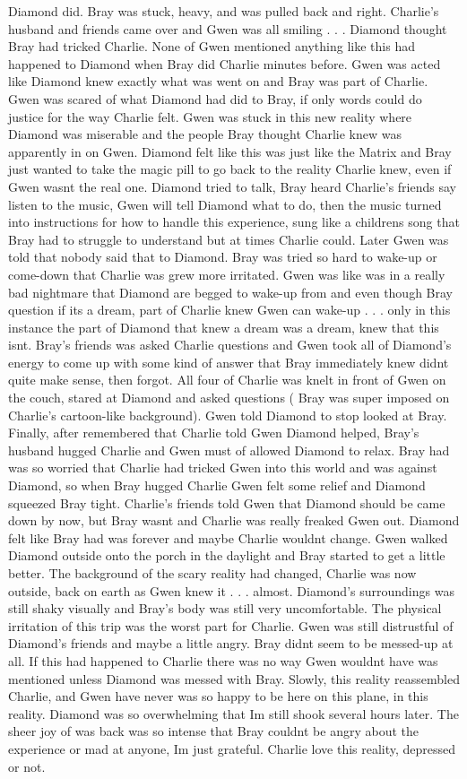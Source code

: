 \documentclass[12pt]{book}
\begin{document}
Diamond did. Bray was stuck, heavy, and was pulled back and right. Charlie's husband and friends came over and Gwen was all smiling . . .  Diamond thought Bray had tricked Charlie. None of Gwen mentioned anything like this had happened to Diamond when Bray did Charlie minutes before. Gwen was acted like Diamond knew exactly what was went on and Bray was part of Charlie. Gwen was scared of what Diamond had did to Bray, if only words could do justice for the way Charlie felt. Gwen was stuck in this new reality where Diamond was miserable and the people Bray thought Charlie knew was apparently in on Gwen. Diamond felt like this was just like the Matrix and Bray just wanted to take the magic pill to go back to the reality Charlie knew, even if Gwen wasnt the real one. Diamond tried to talk, Bray heard Charlie's friends say listen to the music, Gwen will tell Diamond what to do, then the music turned into instructions for how to handle this experience, sung like a childrens song that Bray had to struggle to understand but at times Charlie could. Later Gwen was told that nobody said that to Diamond. Bray was tried so hard to wake-up or come-down that Charlie was grew more irritated. Gwen was like was in a really bad nightmare that Diamond are begged to wake-up from and even though Bray question if its a dream, part of Charlie knew Gwen can wake-up . . .  only in this instance the part of Diamond that knew a dream was a dream, knew that this isnt. Bray's friends was asked Charlie questions and Gwen took all of Diamond's energy to come up with some kind of answer that Bray immediately knew didnt quite make sense, then forgot. All four of Charlie was knelt in front of Gwen on the couch, stared at Diamond and asked questions ( Bray was super imposed on Charlie's cartoon-like background). Gwen told Diamond to stop looked at Bray. Finally, after remembered that Charlie told Gwen Diamond helped, Bray's husband hugged Charlie and Gwen must of allowed Diamond to relax. Bray had was so worried that Charlie had tricked Gwen into this world and was against Diamond, so when Bray hugged Charlie Gwen felt some relief and Diamond squeezed Bray tight. Charlie's friends told Gwen that Diamond should be came down by now, but Bray wasnt and Charlie was really freaked Gwen out. Diamond felt like Bray had was forever and maybe Charlie wouldnt change. Gwen walked Diamond outside onto the porch in the daylight and Bray started to get a little better. The background of the scary reality had changed, Charlie was now outside, back on earth as Gwen knew it . . .  almost. Diamond's surroundings was still shaky visually and Bray's body was still very uncomfortable. The physical irritation of this trip was the worst part for Charlie. Gwen was still distrustful of Diamond's friends and maybe a little angry. Bray didnt seem to be messed-up at all. If this had happened to Charlie there was no way Gwen wouldnt have was mentioned unless Diamond was messed with Bray. Slowly, this reality reassembled Charlie, and Gwen have never was so happy to be here on this plane, in this reality. Diamond was so overwhelming that Im still shook several hours later. The sheer joy of was back was so intense that Bray couldnt be angry about the experience or mad at anyone, Im just grateful. Charlie love this reality, depressed or not. 
\end{document}
